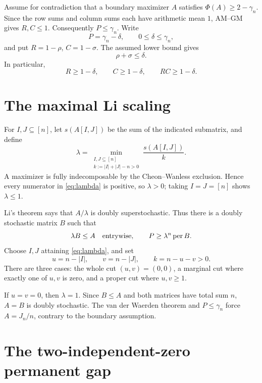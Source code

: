 \documentclass[11pt]{article}
\theoremstyle{remark}
\newcommand{\per}{\operatorname{per}}
\begin{document}
Assume for contradiction that a boundary maximizer $A$ satisfies
$\Phi(A)\ge2-\gamma_n$.  Since the row sums and column sums each have
arithmetic mean $1$, AM--GM gives $R,C\le1$.  Consequently $P\le\gamma_n$.
Write
\[
 P=\gamma_n-\delta,\qquad 0\le\delta\le\gamma_n,
\]
and put $R=1-\rho$, $C=1-\sigma$.  The assumed lower bound gives
\begin{equation}\label{eq:shared-deficit}
 \rho+\sigma\le\delta.
\end{equation}
In particular,
\begin{equation}\label{eq:product-lower}
 R\ge1-\delta,\qquad C\ge1-\delta,
 \qquad RC\ge1-\delta.
\end{equation}

\section{The maximal Li scaling}

For $I,J\subseteq[n]$, let $s(A[I,J])$ be the sum of the indicated submatrix,
and define
\begin{equation}\label{eq:lambda}
 \lambda=
 \min_{\substack{I,J\subseteq[n]\\k:=|I|+|J|-n>0}}
 \frac{s(A[I,J])}{k}.
\end{equation}
A maximizer is fully indecomposable by the Cheon--Wanless exclusion.  Hence
every numerator in \eqref{eq:lambda} is positive, so $\lambda>0$; taking
$I=J=[n]$ shows $\lambda\le1$.

Li's theorem says that $A/\lambda$ is doubly superstochastic.  Thus there is a
doubly stochastic matrix $B$ such that
\begin{equation}\label{eq:domination}
 \lambda B\le A\quad\hbox{entrywise},
 \qquad P\ge\lambda^n\per B.
\end{equation}
Choose $I,J$ attaining \eqref{eq:lambda}, and set
\[
 u=n-|I|,\qquad v=n-|J|,\qquad k=n-u-v>0.
\]
There are three cases: the whole cut $(u,v)=(0,0)$, a marginal cut where
exactly one of $u,v$ is zero, and a proper cut where $u,v\ge1$.

If $u=v=0$, then $\lambda=1$.  Since $B\le A$ and both matrices have total
sum $n$, $A=B$ is doubly stochastic.  The van der Waerden theorem and
$P\le\gamma_n$ force $A=J_n/n$, contrary to the boundary assumption.

\section{The two-independent-zero permanent gap}
\end{document}
